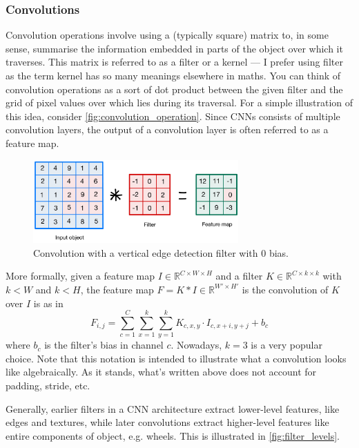 \documentclass[11pt]{article}
\begin{document}
\subsubsection{Convolutions}
Convolution operations involve using a (typically square) matrix to, in some sense, summarise the information embedded in parts of the object over which it traverses. This matrix is referred to as a filter or a kernel — I prefer using filter as the term kernel has so many meanings elsewhere in maths. You can think of convolution operations as a sort of dot product between the given filter and the grid of pixel values over which lies during its traversal. For a simple illustration of this idea, consider \autoref{fig:convolution_operation}. Since CNNs consists of multiple convolution layers, the output of a convolution layer is often referred to as a feature map.

\begin{figure}[t]
    \centering
    \includegraphics[width=0.7\textwidth]{./figures/neural_nets/CNN_convolution.pdf}
    \caption{Convolution with a vertical edge detection filter with 0 bias.}
    \label{fig:convolution_operation}
\end{figure}

More formally, given a feature map $I\in\mathbb{R}^{C\times W\times H}$ and a filter $K\in\mathbb{R}^{C\times k\times k}$ with $k<W$ and $k<H$, the feature map $F=K*I\in\mathbb{R}^{W'\times H'}$ is the convolution of $K$ over $I$ is as in
$$
F_{i,j}
=
\sum_{c=1}^C\sum_{x=1}^{k}\sum_{y=1}^{k}K_{c,x,y}\cdot I_{c,x+i,y+j}+b_c
$$
where $b_c$ is the filter's bias in channel $c$. Nowadays, $k=3$ is a very popular choice. Note that this notation is intended to illustrate what a convolution looks like algebraically. As it stands, what's written above does not account for padding, stride, etc.

Generally, earlier filters in a CNN architecture extract lower-level features, like edges and textures, while later convolutions extract higher-level features like entire components of object, e.g. wheels. This is illustrated in \autoref{fig:filter_levels}.
\end{document}
